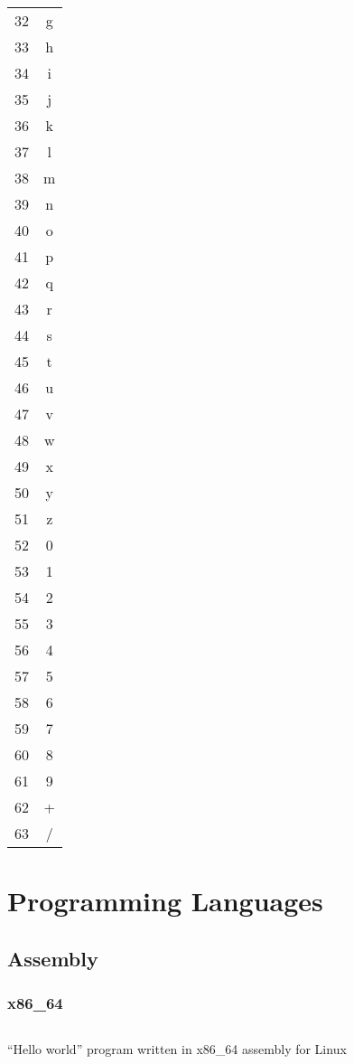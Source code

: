 \documentclass[12pt]{book}
\begin{document}
{\begin{tabular}{c c}
    \hline
    32 & g \\
    33 & h \\
    34 & i \\
    35 & j \\
    36 & k \\
    37 & l \\
    38 & m \\
    39 & n \\
    40 & o \\
    41 & p \\
    42 & q \\
    43 & r \\
    44 & s \\
    45 & t \\
    46 & u \\
    47 & v \\
    48 & w \\
    49 & x \\
    50 & y \\
    51 & z \\
    52 & 0 \\
    53 & 1 \\
    54 & 2 \\
    55 & 3 \\
    56 & 4 \\
    57 & 5 \\
    58 & 6 \\
    59 & 7 \\
    60 & 8 \\
    61 & 9 \\
    62 & + \\
    63 & / \\
  \end{tabular}}

  \chapter{Programming Languages}

  \section{Assembly}

  \subsection{x86\_64}

  \begin{listing}[H]
    \inputminted[frame=lines]{asm}{code/hello_world.asm}
    \caption{``Hello world'' program written in x86\_64 assembly for Linux}
    \label{lst:hello-world-asm}
  \end{listing}
\end{document}
